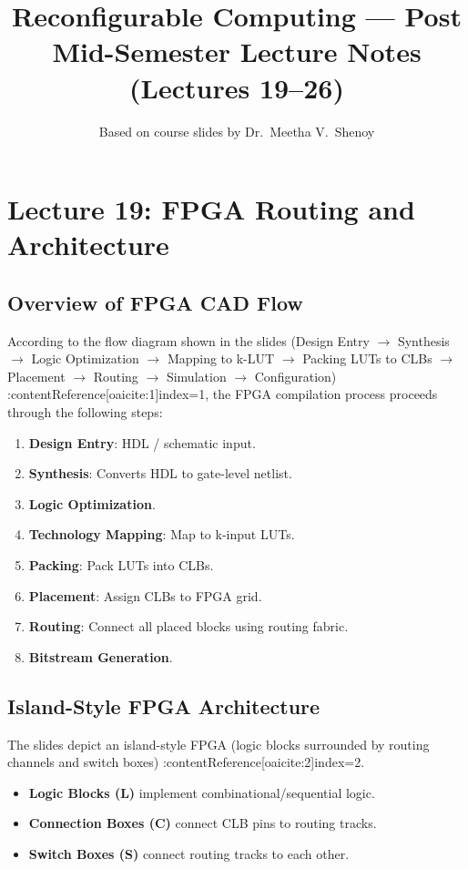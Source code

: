 \documentclass[11pt]{article}
\title{Reconfigurable Computing --- Post Mid-Semester Lecture Notes (Lectures 19--26)}
\author{Based on course slides by Dr.~Meetha V.~Shenoy}
\date{}
\begin{document}
\maketitle
\tableofcontents
\newpage

\section{Lecture 19: FPGA Routing and Architecture}

\subsection{Overview of FPGA CAD Flow}
According to the flow diagram shown in the slides
(Design Entry $\rightarrow$ Synthesis $\rightarrow$ Logic Optimization $\rightarrow$ Mapping to k-LUT
$\rightarrow$ Packing LUTs to CLBs $\rightarrow$ Placement $\rightarrow$ Routing $\rightarrow$ Simulation
$\rightarrow$ Configuration)
:contentReference[oaicite:1]{index=1}, the FPGA compilation process proceeds through the following steps:

\begin{enumerate}
    \item \textbf{Design Entry}: HDL / schematic input.
    \item \textbf{Synthesis}: Converts HDL to gate-level netlist.
    \item \textbf{Logic Optimization}.
    \item \textbf{Technology Mapping}: Map to k-input LUTs.
    \item \textbf{Packing}: Pack LUTs into CLBs.
    \item \textbf{Placement}: Assign CLBs to FPGA grid.
    \item \textbf{Routing}: Connect all placed blocks using routing fabric.
    \item \textbf{Bitstream Generation}.
\end{enumerate}

\subsection{Island-Style FPGA Architecture}
The slides depict an island-style FPGA (logic blocks surrounded by routing channels and switch boxes)
:contentReference[oaicite:2]{index=2}.

\begin{itemize}
    \item \textbf{Logic Blocks (L)} implement combinational/sequential logic.
    \item \textbf{Connection Boxes (C)} connect CLB pins to routing tracks.
    \item \textbf{Switch Boxes (S)} connect routing tracks to each other.
\end{itemize}
\end{document}
